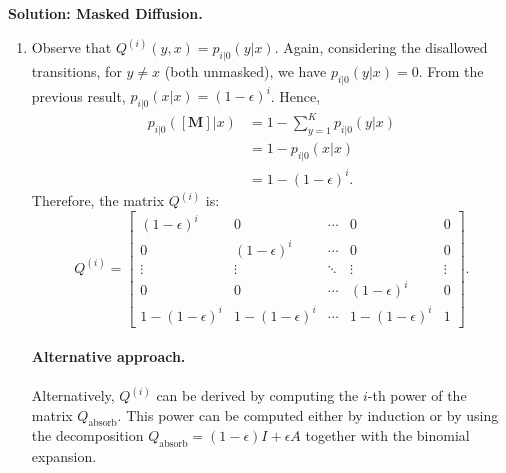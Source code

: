 \documentclass[12pt]{article}
\begin{document}
\begin{enumerate}
\begin{solution}{\bf Solution: Masked Diffusion.}
\begin{enumerate}
By the Markov property of the diffusion forward process, we have:
\begin{equation*}
    p_{i|0}(x|x) = \sum_{x_{i-1}\in\overline{\cX}} \sum_{x_{i-2}\in\overline{\cX}} \cdots \sum_{x_1\in\overline{\cX}} p_{i|i-1}(x|x_{i-1})p_{i-1|i-2}(x_{i-1}|x_{i-2})\cdots p_{1|0}(x_1|x)
\end{equation*}

Taking into account the disallowed transitions, we obtain:
\begin{align*}
    p_{i|0}(x|x) 
    & = p_{i|i-1}(x|x)p_{i-1|i-2}(x|x)\cdots p_{1|0}(x|x) \\
    & = (1-\epsilon)(1-\epsilon)\cdots(1-\epsilon) \\
    & = (1-\epsilon)^i.
\end{align*}

\item
Observe that \(Q^{(i)}(y,x)=p_{i|0}(y|x)\).
Again, considering the disallowed transitions, for \(y \neq x\) (both unmasked), we have \(p_{i|0}(y|x) = 0\). From the previous result, \(p_{i|0}(x|x)=(1-\epsilon)^i\). Hence,
\begin{align*}
    p_{i|0}([\mathbf{M}]|x) 
    & = 1 - \sum_{y=1}^K p_{i|0}(y|x) \\
    & = 1 - p_{i|0}(x|x) \\
    & = 1 - (1-\epsilon)^i.
\end{align*}
Therefore, the matrix \(Q^{(i)}\) is:
\begin{equation*}
    Q^{(i)} = \left[ \begin{matrix}
        (1-\epsilon)^i & 0 & \cdots & 0 & 0 \\
        0 & (1-\epsilon)^i & \cdots & 0 & 0 \\
        \vdots & \vdots & \ddots & \vdots & \vdots \\
        0 & 0 & \cdots & (1-\epsilon)^i & 0 \\
        1-(1-\epsilon)^i & 1-(1-\epsilon)^i & \cdots & 1-(1-\epsilon)^i & 1
    \end{matrix} \right].
\end{equation*}

\paragraph{Alternative approach.}  
Alternatively, \(Q^{(i)}\) can be derived by computing the \(i\)-th power of the matrix \(Q_\text{absorb}\). This power can be computed either by induction or by using the decomposition \(Q_\text{absorb}=(1-\epsilon)I+\epsilon A\) together with the binomial expansion.


\end{enumerate}
\end{solution}
\end{enumerate}
\end{document}
